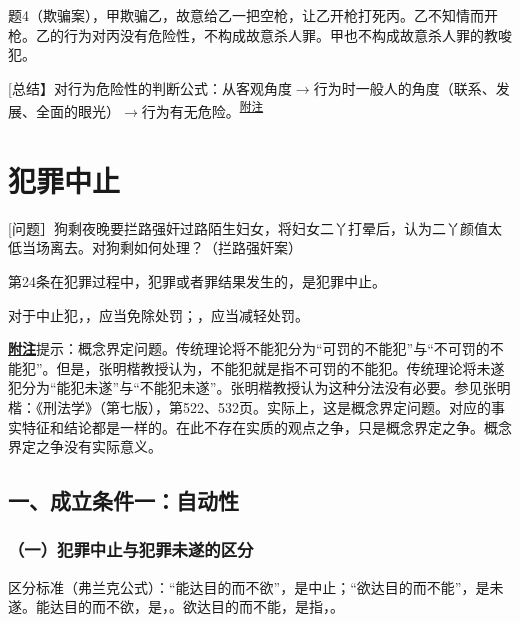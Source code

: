 题4（欺骗案），甲欺骗乙，故意给乙一把空枪，让乙开枪打死丙。乙不知情而开枪。乙的行为对丙没有危险性，不构成故意杀人罪。甲也不构成故意杀人罪的教唆犯。

[总结】对行为危险性的判断公式：从客观角度\ensuremath{\rightarrow}行为时一般人的角度（联系、发展、全面的眼光）\ensuremath{\rightarrow}行为有无危险。\hypertarget{extended-note-121-1-ref}{}\textsuperscript{\hyperlink{extended-note-121-1}{附注}}

\section{犯罪中止}

[问题］狗剩夜晚要拦路强奸过路陌生妇女，将妇女二丫打晕后，认为二丫颜值太低当场离去。对狗剩如何处理？（拦路强奸案）

第24条在犯罪过程中，犯罪或者罪结果发生的，是犯罪中止。

对于中止犯，，应当免除处罚；，应当减轻处罚。

\par\noindent\hypertarget{extended-note-121-1}{\hyperlink{extended-note-121-1-ref}{\textbf{附注}}}\quad 提示：概念界定问题。传统理论将不能犯分为“可罚的不能犯”与“不可罚的不能犯”。但是，张明楷教授认为，不能犯就是指不可罚的不能犯。传统理论将未遂犯分为“能犯未遂”与“不能犯未遂”。张明楷教授认为这种分法没有必要。参见张明楷：《刑法学》（第七版），第522、532页。实际上，这是概念界定问题。对应的事实特征和结论都是一样的。在此不存在实质的观点之争，只是概念界定之争。概念界定之争没有实际意义。


\subsection*{一、成立条件一：自动性}

\subsubsection*{（一）犯罪中止与犯罪未遂的区分}

区分标准（弗兰克公式）：“能达目的而不欲”，是中止；“欲达目的而不能”，是未遂。能达目的而不欲，是，。欲达目的而不能，是指，。

